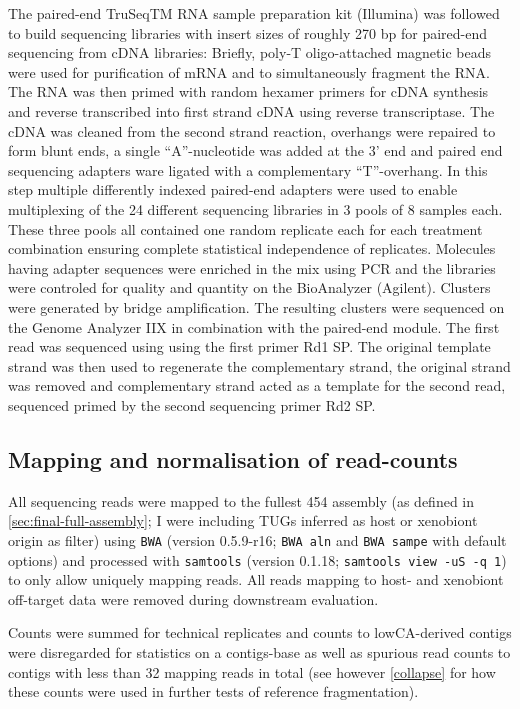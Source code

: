 The paired-end TruSeqTM RNA sample preparation kit (Illumina) was
followed to build sequencing libraries with insert sizes of roughly
270 bp for paired-end sequencing from cDNA libraries: Briefly, poly-T
oligo-attached magnetic beads were used for purification of mRNA and
to simultaneously fragment the RNA. The RNA was then primed with
random hexamer primers for cDNA synthesis and reverse transcribed into
first strand cDNA using reverse transcriptase. The cDNA was cleaned
from the second strand reaction, overhangs were repaired to form blunt
ends, a single ``A''-nucleotide was added at the 3' end and paired end
sequencing adapters ware ligated with a complementary
``T''-overhang. In this step multiple differently indexed paired-end
adapters were used to enable multiplexing of the 24 different
sequencing libraries in 3 pools of 8 samples each. These three pools
all contained one random replicate each for each treatment combination
ensuring complete statistical independence of replicates. Molecules
having adapter sequences were enriched in the mix using PCR and the
libraries were controled for quality and quantity on the BioAnalyzer
(Agilent). Clusters were generated by bridge amplification. The
resulting clusters were sequenced on the Genome Analyzer IIX in
combination with the paired-end module. The first read was sequenced
using using the first primer Rd1 SP. The original template strand was
then used to regenerate the complementary strand, the original strand
was removed and complementary strand acted as a template for the
second read, sequenced primed by the second sequencing primer Rd2 SP.

\subsection{Mapping and normalisation of read-counts}

All sequencing reads were mapped to the fullest 454 assembly (as
defined in \ref{sec:final-full-assembly}; I were including TUGs
inferred as host or xenobiont origin as filter) using \texttt{BWA}
\cite{pmid20080505} (version 0.5.9-r16; \texttt{BWA aln} and
\texttt{BWA sampe} with default options) and processed with
\texttt{samtools} \cite{journals/bioinformatics/LiHWFRHMAD09} (version
0.1.18; \texttt{samtools view -uS -q 1}) to only allow uniquely
mapping reads. All reads mapping to host- and xenobiont off-target
data were removed during downstream evaluation.

Counts were summed for technical replicates and counts to
lowCA-derived contigs were disregarded for statistics on a
contigs-base as well as spurious read counts to contigs with less
than 32 mapping reads in total (see however \ref{collapse} for how
these counts were used in further tests of reference fragmentation).

